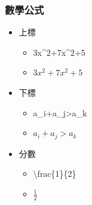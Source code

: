 \documentclass[mathserif]{beamer}
\begin{document}
\begin{frame}
    \frametitle{數學公式}
    \begin{itemize}
        \item 上標
            \begin{itemize}
                \item 3x\^{}2+7x\^{}2+5
                \item $3x^2+7x^2+5$
            \end{itemize}
        \item 下標
            \begin{itemize}
                \item a\_{}i+a\_{}j>a\_{}k
                \item $a_i+a_j>a_k$
            \end{itemize}
        \item 分數
            \begin{itemize}
                \item \textbackslash frac\{1\}\{2\}
                \item $\frac{1}{2}$
            \end{itemize}
    \end{itemize}
\end{frame}
\end{document}
